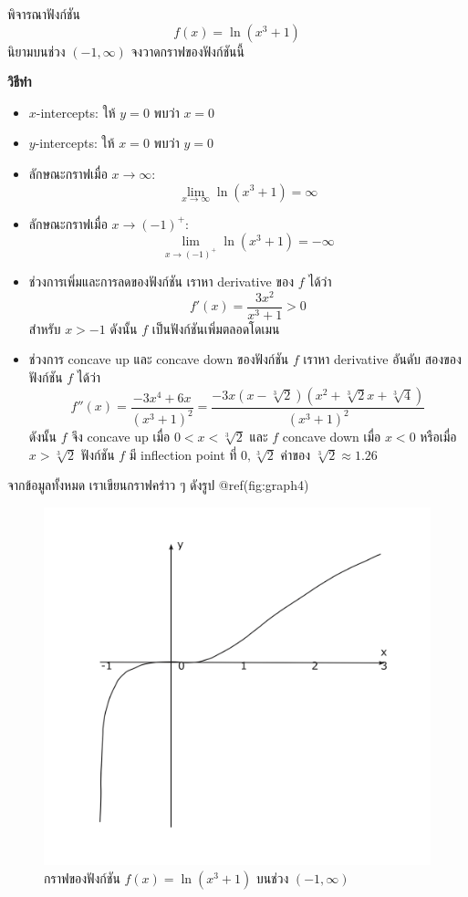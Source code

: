 \documentclass[
]{book}
\begin{document}
พิจารณาฟังก์ชัน \[f(x) = \ln(x^3+1)\] นิยามบนช่วง \((-1,\infty)\)
จงวาดกราฟของฟังก์ชันนี้

\textbf{วิธีทำ}

\begin{itemize}
\item
  \(x\)-intercepts: ให้ \(y=0\) พบว่า \(x=0\)
\item
  \(y\)-intercepts: ให้ \(x=0\) พบว่า \(y=0\)
\item
  ลักษณะกราฟเมื่อ \(x \to \infty\):
  \[\lim_{x\to\infty} \ln(x^3+1) = \infty\]
\item
  ลักษณะกราฟเมื่อ \(x\to (-1)^+\):
  \[\lim_{x\to (-1)^+} \ln(x^3+1) = -\infty\]
\item
  ช่วงการเพิ่มและการลดของฟังก์ชัน เราหา derivative ของ \(f\) ได้ว่า
  \[f'(x) = \frac{3x^2}{x^3+1} > 0\] สำหรับ \(x>-1\) ดังนั้น \(f\)
  เป็นฟังก์ชันเพิ่มตลอดโดเมน
\item
  ช่วงการ concave up และ concave down ของฟังก์ชัน \(f\) เราหา derivative
  อันดับ สองของฟังก์ชัน \(f\) ได้ว่า
  \[f''(x) = \frac{-3x^4+6x}{(x^3+1)^2} = \frac{-3x(x-\sqrt[3]{2})(x^2+\sqrt[3]{2}x+\sqrt[3]{4})}{(x^3+1)^2}\]
  ดังนั้น \(f\) จึง concave up เมื่อ \(0<x<\sqrt[3]{2}\) และ \(f\) concave
  down เมื่อ \(x<0\) หรือเมื่อ \(x>\sqrt[3]{2}\) ฟังก์ชัน \(f\) มี inflection
  point ที่ \(0,\sqrt[3]{2}\) ค่าของ \(\sqrt[3]{2} \approx 1.26\)
\end{itemize}

จากข้อมูลทั้งหมด เราเขียนกราฟคร่าว ๆ ดังรูป @ref(fig:graph4)

\begin{figure}

{\centering \includegraphics[width=0.5\linewidth]{images/graph4} 

}

\caption{กราฟของฟังก์ชัน $f(x) = \ln(x^3+1)$ บนช่วง $(-1,\infty)$}\label{fig:graph4}
\end{figure}
\end{document}
